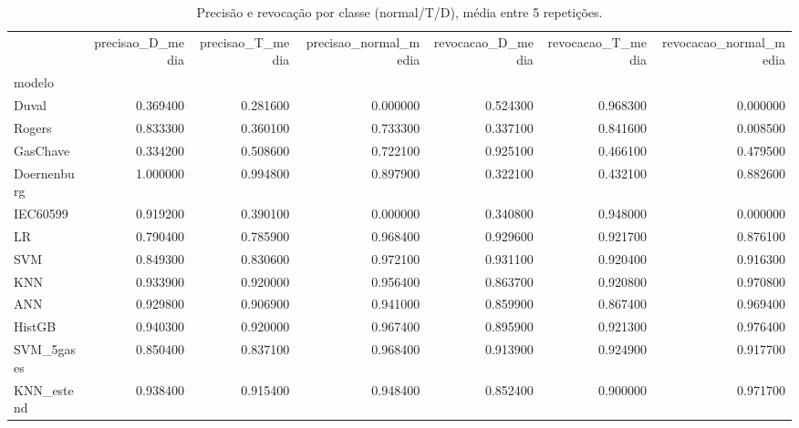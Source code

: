 \begin{table}[htbp]
\centering
\caption{Precisão e revocação por classe (normal/T/D), média entre 5 repetições.}
\begin{tabular}{lrrrrrr}
\toprule
 & precisao\_D\_media & precisao\_T\_media & precisao\_normal\_media & revocacao\_D\_media & revocacao\_T\_media & revocacao\_normal\_media \\
modelo &  &  &  &  &  &  \\
\midrule
Duval & 0.369400 & 0.281600 & 0.000000 & 0.524300 & 0.968300 & 0.000000 \\
Rogers & 0.833300 & 0.360100 & 0.733300 & 0.337100 & 0.841600 & 0.008500 \\
GasChave & 0.334200 & 0.508600 & 0.722100 & 0.925100 & 0.466100 & 0.479500 \\
Doernenburg & 1.000000 & 0.994800 & 0.897900 & 0.322100 & 0.432100 & 0.882600 \\
IEC60599 & 0.919200 & 0.390100 & 0.000000 & 0.340800 & 0.948000 & 0.000000 \\
LR & 0.790400 & 0.785900 & 0.968400 & 0.929600 & 0.921700 & 0.876100 \\
SVM & 0.849300 & 0.830600 & 0.972100 & 0.931100 & 0.920400 & 0.916300 \\
KNN & 0.933900 & 0.920000 & 0.956400 & 0.863700 & 0.920800 & 0.970800 \\
ANN & 0.929800 & 0.906900 & 0.941000 & 0.859900 & 0.867400 & 0.969400 \\
HistGB & 0.940300 & 0.920000 & 0.967400 & 0.895900 & 0.921300 & 0.976400 \\
SVM\_5gases & 0.850400 & 0.837100 & 0.968400 & 0.913900 & 0.924900 & 0.917700 \\
KNN\_estend & 0.938400 & 0.915400 & 0.948400 & 0.852400 & 0.900000 & 0.971700 \\
\bottomrule
\end{tabular}

\end{table}
